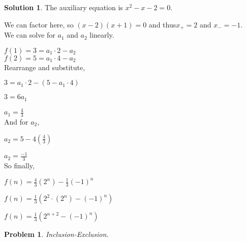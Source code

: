 \documentclass{article}
\newtheorem{problem}{Problem}
\theoremstyle{definition}
\newtheorem*{solution}{Solution}
\begin{document}
\begin{solution}
The auxiliary equation is \(x^2-x-2=0\).

We can factor here, so \((x-2)(x+1)=0\) and thus\(x_+=2\) and \(x_-=-1\). \\

We can solve for \(a_1\) and \(a_2\) linearly.

\(f(1)=3=a_1\cdot 2 - a_2\) \\

\(f(2)=5=a_1\cdot 4 - a_2\) \\

Rearrange and substitute,

\(3=a_1\cdot 2 - (5-a_1\cdot 4)\)

\(3=6a_1\)

\(a_1=\frac{4}{3}\) \\

And for \(a_2\),

\(a_2 = 5 - 4(\frac{4}{3})\)

\(a_2 = \frac{-1}{3}\) \\

So finally,

\(f(n)=\frac{4}{3}(2^n) - \frac{1}{3}(-1)^n\)

\(f(n)=\frac{1}{3}(2^2 \cdot (2^n) - (-1)^n)\)

\(f(n)=\frac{1}{3}(2^{n+2} - (-1)^n)\)

\end{solution}

\begin{problem} 

Inclusion-Exclusion.

\end{problem}
\end{document}
